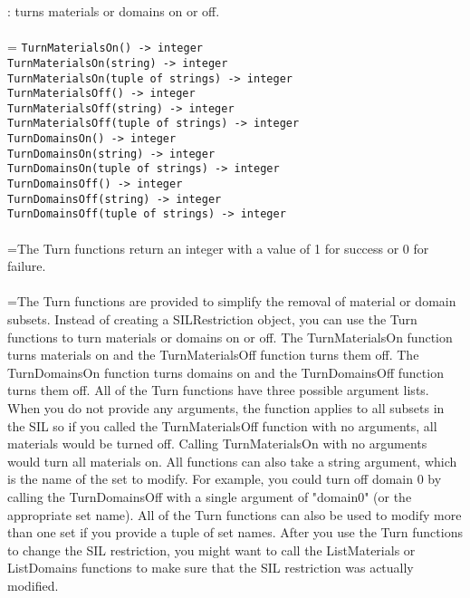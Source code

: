 \documentclass[10pt,a4paper]{report}
\begin{document}
{}
: turns materials or domains on or off.\\[-3mm]

 \\ 
\hangindent=\parindent 
\verb!TurnMaterialsOn() -> integer!\\ 
\verb!TurnMaterialsOn(string) -> integer!\\ 
\verb!TurnMaterialsOn(tuple of strings) -> integer!\\ 
\verb!TurnMaterialsOff() -> integer!\\ 
\verb!TurnMaterialsOff(string) -> integer!\\ 
\verb!TurnMaterialsOff(tuple of strings) -> integer!\\ 
\verb!TurnDomainsOn() -> integer!\\ 
\verb!TurnDomainsOn(string) -> integer!\\ 
\verb!TurnDomainsOn(tuple of strings) -> integer!\\ 
\verb!TurnDomainsOff() -> integer!\\ 
\verb!TurnDomainsOff(string) -> integer!\\ 
\verb!TurnDomainsOff(tuple of strings) -> integer!\\ [-3mm]

 \\ 
\hangindent=\parindent The Turn functions return an integer with a value of 1 for success or 0 for failure. \\[-3mm] 

 \\ 
\hangindent=\parindent The Turn functions are provided to simplify the removal of material or domain subsets. Instead of creating a SILRestriction object, you can use the Turn functions to turn materials or domains on or off. The TurnMaterialsOn function turns materials on and the TurnMaterialsOff function turns them off. The TurnDomainsOn function turns domains on and the TurnDomainsOff function turns them off. All of the Turn functions have three possible argument lists. When you do not provide any arguments, the function applies to all subsets in the SIL so if you called the TurnMaterialsOff function with no arguments, all materials would be turned off. Calling TurnMaterialsOn with no arguments would turn all materials on. All functions can also take a string argument, which is the name of the set to modify. For example, you could turn off domain 0 by calling the TurnDomainsOff with a single argument of "domain0" (or the appropriate set name). All of the Turn functions can also be used to modify more than one set if you provide a tuple of set names. After you use the Turn functions to change the SIL restriction, you might want to call the ListMaterials or ListDomains functions to make sure that the SIL restriction was actually modified. \\[-3mm] 
\end{document}
